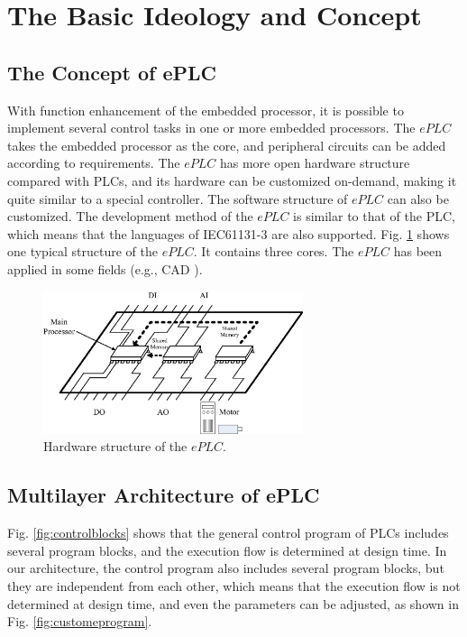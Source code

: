 \documentclass[journal]{IEEEtran}
\begin{document}
\section{The Basic Ideology and Concept}
\label{The-Basic-Ideology}


\subsection{The Concept of ePLC}
With function enhancement of the embedded processor, it is possible to implement several control tasks in one or more embedded processors. The $ePLC$ takes the embedded processor as the core, and peripheral circuits can be added according to requirements. The $ePLC$ has more open hardware structure compared with PLCs, and its hardware can be customized on-demand, making it quite similar to a special controller. The software structure of $ePLC$ can also be customized. The development method of the $ePLC$ is similar to that of the PLC, which means that the languages of IEC61131-3 are also supported\cite{A40}. Fig. \ref{fig:multi_cpuPLC1} shows one typical structure of the $ePLC$. It contains three cores. The $ePLC$ has been applied in some fields (e.g., CAD \cite{Huifeng2015A}).

\begin{figure}
	\centering
	\includegraphics[width=3in]{fig/FIG1_TII-18-0024.eps}
	\caption{ Hardware structure of the $ePLC$.}
	\label{fig:multi_cpuPLC1}
\end{figure}
\subsection{Multilayer Architecture of ePLC}
 Fig. \ref{fig:controlblocks} shows that the general control program of PLCs includes several program blocks, and the execution flow is determined at design time. In our architecture, the control program also includes several program blocks, but they are independent from each other, which means that the execution flow is not determined at design time, and even the parameters can be adjusted, as  shown in Fig. \ref{fig:customeprogram}.
\end{document}
